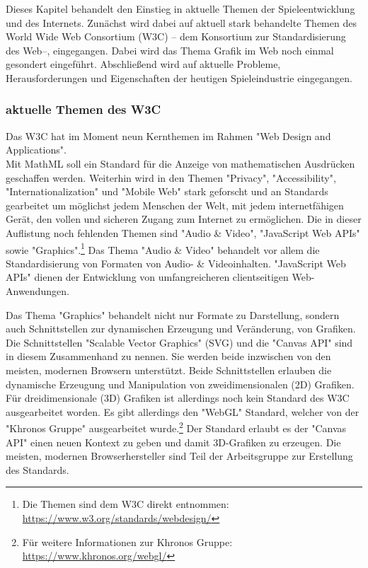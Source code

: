 \noindent Dieses Kapitel behandelt den Einstieg in aktuelle Themen der Spieleentwicklung und des Internets. Zunächst wird dabei auf aktuell stark behandelte Themen des World Wide Web Consortium (W3C) -- dem Konsortium zur Standardisierung des Web--, eingegangen. Dabei wird das Thema Grafik im Web noch einmal gesondert eingeführt. Abschließend wird auf aktuelle Probleme, Herausforderungen und Eigenschaften der heutigen Spieleindustrie eingegangen.

\subsubsection{aktuelle Themen des W3C}
Das W3C hat im Moment neun Kernthemen im Rahmen "Web Design and Applications".\\
Mit MathML soll ein Standard für die Anzeige von mathematischen Ausdrücken geschaffen werden. Weiterhin wird in den Themen "Privacy", "Accessibility", "Internationalization" und "Mobile Web" stark geforscht und an Standards gearbeitet um möglichst jedem Menschen der Welt, mit jedem internetfähigen Gerät, den vollen und sicheren Zugang zum Internet zu ermöglichen. Die in dieser Auflistung noch fehlenden Themen sind "Audio \& Video", "JavaScript Web APIs" sowie "Graphics".\footnote{Die Themen sind dem W3C direkt entnommen: \url{https://www.w3.org/standards/webdesign/}}
Das Thema "Audio \& Video" behandelt vor allem die Standardisierung von Formaten von Audio- \& Videoinhalten. "JavaScript Web APIs" dienen der Entwicklung von umfangreicheren clientseitigen Web-Anwendungen.

\noindent Das Thema "Graphics" behandelt nicht nur Formate zu Darstellung, sondern auch Schnittstellen zur dynamischen Erzeugung und Veränderung, von Grafiken. Die Schnittstellen "Scalable Vector Graphics" (SVG) und die "Canvas API" sind in diesem Zusammenhand zu nennen. Sie werden beide inzwischen von den meisten, modernen Browsern unterstützt. Beide Schnittstellen erlauben die dynamische Erzeugung und Manipulation von zweidimensionalen (2D) Grafiken. Für dreidimensionale (3D) Grafiken ist allerdings noch kein Standard des W3C ausgearbeitet worden. Es gibt allerdings den "WebGL" Standard, welcher von der "Khronos Gruppe" ausgearbeitet wurde.\footnote{Für weitere Informationen zur Khronos Gruppe: \url{https://www.khronos.org/webgl/}} Der Standard erlaubt es der "Canvas API" einen neuen Kontext zu geben und damit 3D-Grafiken zu erzeugen. Die meisten, modernen Browserhersteller sind Teil der Arbeitsgruppe zur Erstellung des Standards.

